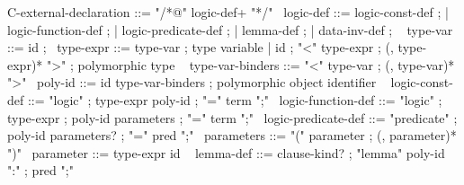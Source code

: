 \begin{syntax}
  C-external-declaration ::= "/*@" logic-def+ "*/"
  \
  logic-def ::= { logic-const-def } ;
          | logic-function-def ;
          | logic-predicate-def ;
          | { lemma-def } ;
          | { data-inv-def } ;
  \
  { type-var } ::= { id } ;
  \
  type-expr ::= { type-var } ; type variable
  | id ;
    { "<" type-expr } ;
    { (, type-expr)* ">" } ; polymorphic type
  \
  { type-var-binders } ::= { "<" type-var };
                       { (, type-var)* ">" }
  \
  poly-id ::= id { type-var-binders } ; polymorphic object identifier
  \
  { logic-const-def } ::= { "logic" } ;
      { type-expr poly-id } ;
      { "=" term ";" }
  \
  logic-function-def ::= "logic" ;
    type-expr ;
    poly-id parameters ;
    "=" term ";"
  \
  logic-predicate-def ::= "predicate" ;
    poly-id parameters? ;
    "=" pred ";"
  \
  parameters ::= "(" parameter ;
    (, parameter)* ")"
  \
  parameter ::= type-expr id
  \
  { lemma-def } ::= { clause-kind? } ; 
                    { "lemma" poly-id ":" };
                      { pred ";" }
\end{syntax}
